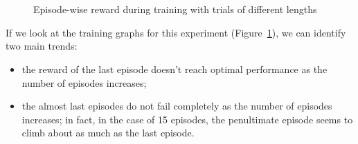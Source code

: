 \begin{figure}
	\centering
	\\
	\\
	\caption{Episode-wise reward during training with trials of different
	lengths}
	\label{fig:varied_episode_number}
\end{figure}

If we look at the training graphs for this experiment 
(Figure~\ref{fig:varied_episode_number}), we can identify two main trends:
\begin{itemize}
	\item the reward of the last episode doesn't reach optimal performance
		as the number of episodes increases;
	\item the almost last episodes do not fail completely as the number of 
		episodes increases; in fact, in the case of 15 episodes, the
		penultimate episode seems to climb about as much as the last
		episode.
\end{itemize}

